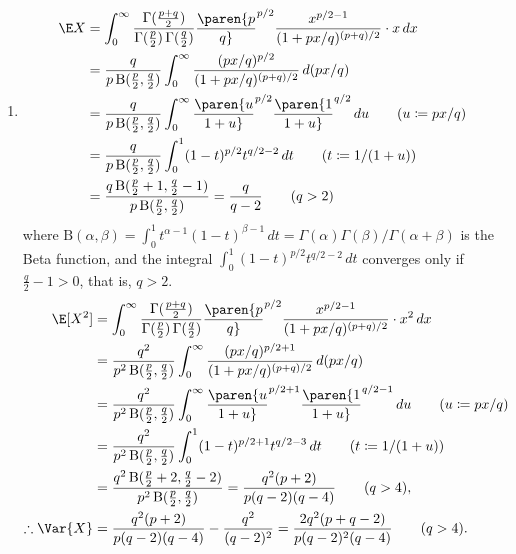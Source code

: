 \documentclass{homework}
\begin{document}
{\begin{enumerate}[label={(\alph*)}, topsep=0pt]
        \item \begin{align*}
                  \E X & = \int_0^\infty \frac{\Gamma(\frac{p+q}2)}{\Gamma(\frac{p}2)\,\Gamma(\frac{q}2)} \paren{p\over q}^{p/2} {x^{p/2-1}\over (1+px/q)^{(p+q)/ 2}}\cdot x\,dx
                  \\ &= \frac q {p\,\mathrm B(\frac p 2,\frac q 2)} \int_0^\infty  {(px/q)^{p/2}\over (1+px/q)^{(p+q)/ 2}}\,d(px/q)
                  \\ &= \frac q {p\,\mathrm B(\frac p 2,\frac q 2)} \int_0^\infty  \paren{u\over 1+u}^{p/2} \paren{1\over 1+u}^{q/2}\,du\tag{$u\coloneqq px/q$}
                  \\ &= \frac q {p\,\mathrm B(\frac p 2,\frac q 2)} \int_0^1 (1-t)^{p/2} t^{q/2 - 2}\,dt\tag{$t\coloneqq 1/(1+u)$}
                  \\ &= \frac {q\,\mathrm B(\frac p2 + 1, \frac q2 - 1)} {p\,\mathrm B(\frac p 2,\frac q 2)} = \frac{q}{q-2} \qquad{(q>2)}
              \end{align*}
              where $\mathrm B(\alpha,\beta)=\int_0^1 t^{\alpha-1}(1-t)^{\beta-1}\,dt=\Gamma(\alpha)\Gamma(\beta)/\Gamma(\alpha+\beta)$ is the Beta function, and the integral $\int_0^1 (1-t)^{p/2} t^{q/2 - 2}\,dt$ converges only if $\frac{q}2-1 > 0$, that is, $q>2$.
              \begin{align*}
                  \E [X^2]           & = \int_0^\infty \frac{\Gamma(\frac{p+q}2)}{\Gamma(\frac{p}2)\,\Gamma(\frac{q}2)} \paren{p\over q}^{p/2} {x^{p/2-1}\over (1+px/q)^{(p+q)/ 2}}\cdot x^2\,dx
                  \\ &= \frac {q^2} {p^2\,\mathrm B(\frac p 2,\frac q 2)} \int_0^\infty  {(px/q)^{p/2+1}\over (1+px/q)^{(p+q)/ 2}}\,d(px/q)
                  \\ &= \frac {q^2} {p^2\,\mathrm B(\frac p 2,\frac q 2)} \int_0^\infty  \paren{u\over 1+u}^{p/2+1} \paren{1\over 1+u}^{q/2-1}\,du\tag{$u\coloneqq px/q$}
                  \\ &= \frac {q^2} {p^2\,\mathrm B(\frac p 2,\frac q 2)} \int_0^1 (1-t)^{p/2+1} t^{q/2 - 3}\,dt\tag{$t\coloneqq 1/(1+u)$}
                  \\ &= \frac {q^2\,\mathrm B(\frac p2 + 2, \frac q2 - 2)} {p^2\,\mathrm B(\frac p 2,\frac q 2)} = \frac{q^2(p+2)}{p(q-2)(q-4)} \qquad{(q>4)},\\
                  \therefore \Var{X} & =  \frac{q^2(p+2)}{p(q-2)(q-4)} - \frac{q^2}{(q-2)^2}
                  = \frac{2q^2(p+q-2)}{p(q-2)^2(q-4)}\qquad (q>4).
              \end{align*}

\end{enumerate}}
\end{document}
